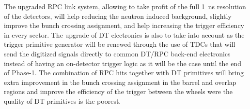 	The upgraded RPC link system, allowing to take profit of the full \SI{1}{ns} resolution of the detectors, will help reducing the neutron induced background, slightly improve the bunch crossing assignment, and help increasing the trigger efficiency in every sector. The upgrade of DT electronics is also to take into account as the trigger primitive generator will be renewed through the use of TDCs that will send the digitized signals directly to common DT/RPC back-end electronics instead of having an on-detector trigger logic as it will be the case until the end of Phase-1. The combination of RPC hits together with DT primitives will bring extra improvement in the bunch crossing assignment in the barrel and overlap regions and improve the efficiency of the trigger between the wheels were the quality of DT primitives is the poorest.

